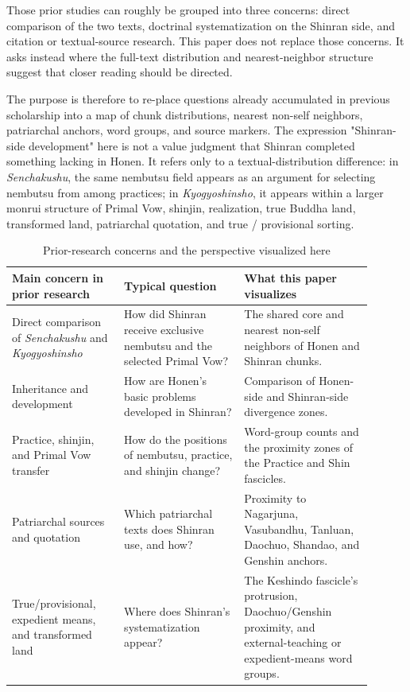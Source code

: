 \documentclass[uplatex,dvipdfmx,11pt,a4paper]{jsarticle}
\begin{document}
Those prior studies can roughly be grouped into three concerns: direct comparison of the two texts, doctrinal systematization on the Shinran side, and citation or textual-source research. This paper does not replace those concerns. It asks instead where the full-text distribution and nearest-neighbor structure suggest that closer reading should be directed.

The purpose is therefore to re-place questions already accumulated in previous scholarship into a map of chunk distributions, nearest non-self neighbors, patriarchal anchors, word groups, and source markers. The expression "Shinran-side development" here is not a value judgment that Shinran completed something lacking in Honen. It refers only to a textual-distribution difference: in \emph{Senchakushu}, the same nembutsu field appears as an argument for selecting nembutsu from among practices; in \emph{Kyogyoshinsho}, it appears within a larger monrui structure of Primal Vow, shinjin, realization, true Buddha land, transformed land, patriarchal quotation, and true / provisional sorting.

\begin{table}[H]
\centering
\footnotesize
\setlength{\tabcolsep}{2pt}
\caption{Prior-research concerns and the perspective visualized here}
\label{tab:prior-research-positioning}
\begin{tabular}{@{}p{0.28\linewidth}p{0.30\linewidth}p{0.32\linewidth}@{}}
\toprule
Main concern in prior research & Typical question & What this paper visualizes \\
\midrule
Direct comparison of \emph{Senchakushu} and \emph{Kyogyoshinsho} & How did Shinran receive exclusive nembutsu and the selected Primal Vow? & The shared core and nearest non-self neighbors of Honen and Shinran chunks. \\
Inheritance and development & How are Honen's basic problems developed in Shinran? & Comparison of Honen-side and Shinran-side divergence zones. \\
Practice, shinjin, and Primal Vow transfer & How do the positions of nembutsu, practice, and shinjin change? & Word-group counts and the proximity zones of the Practice and Shin fascicles. \\
Patriarchal sources and quotation & Which patriarchal texts does Shinran use, and how? & Proximity to Nagarjuna, Vasubandhu, Tanluan, Daochuo, Shandao, and Genshin anchors. \\
True/provisional, expedient means, and transformed land & Where does Shinran's systematization appear? & The Keshindo fascicle's protrusion, Daochuo/Genshin proximity, and external-teaching or expedient-means word groups. \\
\bottomrule
\end{tabular}
\end{table}
\end{document}
